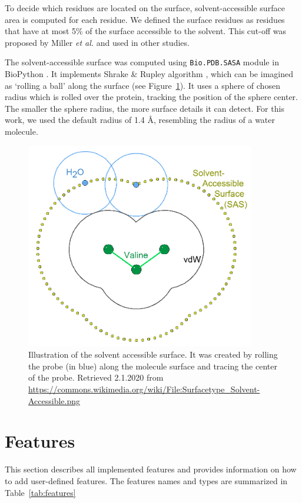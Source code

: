 To decide which residues are located on the surface, solvent-accessible surface area is computed for each residue. We defined the surface residues as residues that have at most 5\% of the surface accessible to the solvent. This cut-off was proposed by Miller \textit{et al.} \cite{sasaCutoff} and used in other studies\cite{jones,lbscomposition}. 

The solvent-accessible surface was computed using \texttt{Bio.PDB.SASA} module in BioPython \cite{sasa}. It implements Shrake \& Rupley algorithm \cite{shrake}, which can be imagined as `rolling a ball' along the surface (see Figure~\ref{fig:sasa}). It uses a sphere of chosen radius which is rolled over the protein, tracking the position of the sphere center. The smaller the sphere radius, the more surface details it can detect. For this work, we used the default radius of 1.4 {\AA}, resembling the radius of a water molecule.

\begin{figure}[!htbp]\centering
\includegraphics[width=100mm]{../img/sasa.png}
\caption[Illustration of the solvent accessible surface]{Illustration of the solvent accessible surface. It was created by rolling the probe (in blue) along the molecule surface and tracing the center of the probe. Retrieved 2.1.2020 from \url{https://commons.wikimedia.org/wiki/File:Surfacetype_Solvent-Accessible.png}}
\label{fig:sasa}
\end{figure}

\section{Features}

This section describes all implemented features and provides information on how to add user-defined features. The features names and types are summarized in Table~\ref{tab:features}

